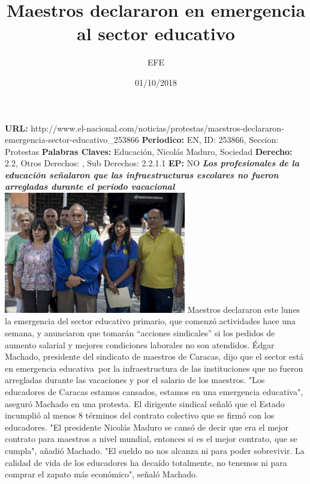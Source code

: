 \documentclass{article}%
\title{\textbf{Maestros declararon en emergencia al sector educativo}}%
\author{EFE}%
\date{01/10/2018}%
\begin{document}
%
\normalsize%
\maketitle%
\textbf{URL: }%
http://www.el{-}nacional.com/noticias/protestas/maestros{-}declararon{-}emergencia{-}sector{-}educativo\_253866\newline%
%
\textbf{Periodico: }%
EN, %
ID: %
253866, %
Seccion: %
Protestas\newline%
%
\textbf{Palabras Claves: }%
Educación, Nicolás Maduro, Sociedad\newline%
%
\textbf{Derecho: }%
2.2, %
Otros Derechos: %
, %
Sub Derechos: %
2.2.1.1\newline%
%
\textbf{EP: }%
NO\newline%
\newline%
%
\textbf{\textit{Los profesionales de la educación señalaron que las infraestructuras escolares no fueron arregladas durante el período vacacional~}}%
\newline%
\newline%
%
\includegraphics[width=300px]{170.jpg}%
\newline%
%
Maestros declararon este lunes la emergencia del sector educativo primario, que comenzó actividades hace una semana, y anunciaron que tomarán “acciones sindicales” si los pedidos de aumento salarial y mejores condiciones laborales no son atendidos.%
\newline%
%
Édgar Machado, presidente del sindicato de maestros de Caracas, dijo que el sector está en emergencia educativa~por la infraestructura de las instituciones que no fueron arregladas durante las vacaciones y por el salario de los maestros.%
\newline%
%
"Los educadores de Caracas estamos cansados, estamos en una emergencia educativa", aseguró Machado en una protesta.%
\newline%
%
El dirigente sindical señaló que el Estado incumplió al menos 8 términos del contrato colectivo que se firmó con los educadores.%
\newline%
%
"El presidente Nicolás Maduro se cansó de decir que era el mejor contrato para maestros a nivel mundial, entonces si es el mejor contrato, que se cumpla", añadió Machado.%
\newline%
%
"El sueldo no nos alcanza ni para poder sobrevivir. La calidad de vida de los educadores ha decaído totalmente, no tenemos ni para comprar el zapato más económico", señaló Machado.%
\newline%
%
\end{document}
